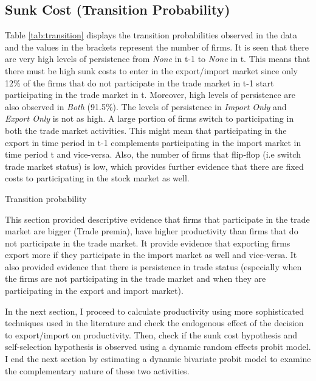 \documentclass[11pt]{article}
\begin{document}
\subsection{Sunk Cost (Transition Probability)}



Table \ref{tab:transition} displays the transition probabilities
observed in the data  and the values in the brackets represent the
number of firms. It is seen that there are very high levels of persistence from
\textit{None} in t-1 to \textit{None} in t. This means that there must be high sunk
costs to enter in the export/import market since only 12\% of the
firms  that do not participate in the trade market in t-1 start
participating in the trade market in t. Moreover,   high levels of persistence
are also observed in  \textit{Both}  (91.5\%). The levels of
persistence in \textit{Import Only} and \textit{Export Only}  is not
as high. A large portion of firms switch to participating in both the trade market
activities. This might mean that participating in the export in time
period in t-1 complements participating in the import  market in time period
t and vice-versa. Also, the number of firms that flip-flop (i.e switch
trade market status) is low, which provides further evidence that there are fixed costs
to participating in the stock market as well. 
\begin{center}
\begin{table}[H]
\caption{Transition probability}
\label{tab:transition}

\end{table}
\end{center}


This section provided descriptive evidence that firms that participate
in the trade market are bigger (Trade premia), have higher
productivity than firms that do not participate in the trade
market. It provide evidence that exporting firms export more if they
participate in the import market as well and vice-versa. It also
provided evidence that there is persistence in trade status
(especially when the firms are not participating in the trade market
and when they are participating in the export and import market). 

In the next section, I proceed to calculate productivity using more
sophisticated techniques used in the literature and check the endogenous effect
of the decision to export/import on productivity. Then, check if the
sunk cost hypothesis and self-selection hypothesis is observed using a
dynamic random effects probit model. I end the next section by
estimating a dynamic bivariate probit model to examine the complementary
nature of these two activities. 
\end{document}
